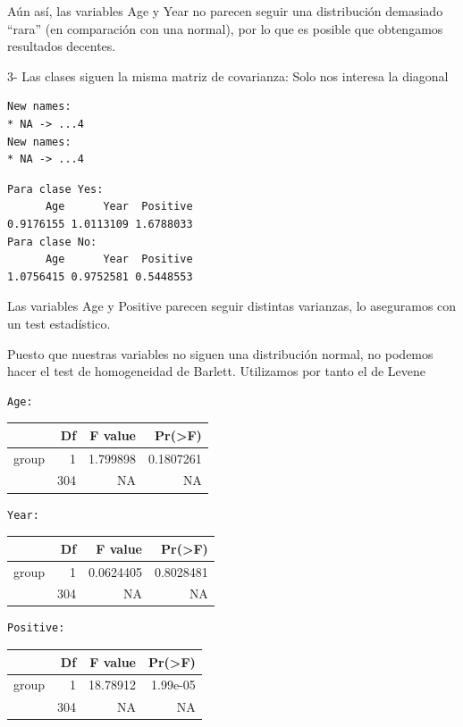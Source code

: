 \documentclass[
]{article}
\begin{document}
Aún así, las variables Age y Year no parecen seguir una distribución
demasiado ``rara'' (en comparación con una normal), por lo que es
posible que obtengamos resultados decentes.

3- Las clases siguen la misma matriz de covarianza: Solo nos interesa la
diagonal

\begin{verbatim}
New names:
* NA -> ...4
New names:
* NA -> ...4
\end{verbatim}

\begin{verbatim}
Para clase Yes:
      Age      Year  Positive 
0.9176155 1.0113109 1.6788033 
Para clase No:
      Age      Year  Positive 
1.0756415 0.9752581 0.5448553 
\end{verbatim}

Las variables Age y Positive parecen seguir distintas varianzas, lo
aseguramos con un test estadístico.

Puesto que nuestras variables no siguen una distribución normal, no
podemos hacer el test de homogeneidad de Barlett. Utilizamos por tanto
el de Levene

\begin{verbatim}
Age:
\end{verbatim}

\begin{tabular}{l|r|r|r}
\hline
  & Df & F value & Pr(>F)\\
\hline
group & 1 & 1.799898 & 0.1807261\\
\hline
 & 304 & NA & NA\\
\hline
\end{tabular}

\begin{verbatim}
Year:
\end{verbatim}

\begin{tabular}{l|r|r|r}
\hline
  & Df & F value & Pr(>F)\\
\hline
group & 1 & 0.0624405 & 0.8028481\\
\hline
 & 304 & NA & NA\\
\hline
\end{tabular}

\begin{verbatim}
Positive:
\end{verbatim}

\begin{tabular}{l|r|r|r}
\hline
  & Df & F value & Pr(>F)\\
\hline
group & 1 & 18.78912 & 1.99e-05\\
\hline
 & 304 & NA & NA\\
\hline
\end{tabular}
\end{document}
